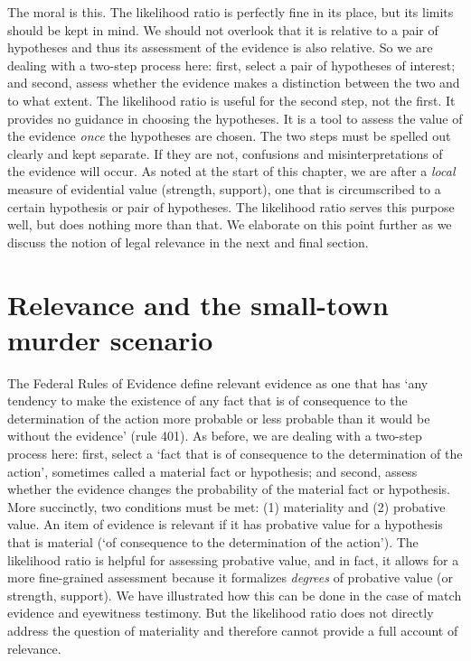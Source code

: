 \documentclass[
  letterpaper,
  DIV=11,
  numbers=noendperiod]{scrartcl}
\begin{document}
The moral is this. The likelihood ratio is perfectly fine in its place,
but its limits should be kept in mind. We should not overlook that it is
relative to a pair of hypotheses and thus its assessment of the evidence
is also relative. So we are dealing with a two-step process here: first,
select a pair of hypotheses of interest; and second, assess whether the
evidence makes a distinction between the two and to what extent. The
likelihood ratio is useful for the second step, not the first. It
provides no guidance in choosing the hypotheses. It is a tool to assess
the value of the evidence \textit{once} the hypotheses are chosen. The
two steps must be spelled out clearly and kept separate. If they are
not, confusions and misinterpretations of the evidence will occur. As
noted at the start of this chapter, we are after a \textit{local}
measure of evidential value (strength, support), one that is
circumscribed to a certain hypothesis or pair of hypotheses. The
likelihood ratio serves this purpose well, but does nothing more than
that. We elaborate on this point further as we discuss the notion of
legal relevance in the next and final section.

\hypertarget{relevance-and-the-small-town-murder-scenario}{%
\section{\texorpdfstring{Relevance and the small-town murder scenario
\label{sec:relevance}}{Relevance and the small-town murder scenario }}\label{relevance-and-the-small-town-murder-scenario}}

The Federal Rules of Evidence define relevant evidence as one that has
`any tendency to make the existence of any fact that is of consequence
to the determination of the action more probable or less probable than
it would be without the evidence' (rule 401). As before, we are dealing
with a two-step process here: first, select a `fact that is of
consequence to the determination of the action', sometimes called a
material fact or hypothesis; and second, assess whether the evidence
changes the probability of the material fact or hypothesis. More
succinctly, two conditions must be met: (1) materiality and (2)
probative value. An item of evidence is relevant if it has probative
value for a hypothesis that is material (`of consequence to the
determination of the action'). The likelihood ratio is helpful for
assessing probative value, and in fact, it allows for a more
fine-grained assessment because it formalizes \textit{degrees} of
probative value (or strength, support). We have illustrated how this can
be done in the case of match evidence and eyewitness testimony. But the
likelihood ratio does not directly address the question of materiality
and therefore cannot provide a full account of relevance.
\end{document}
